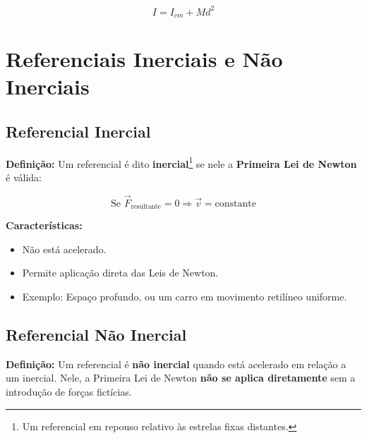 \documentclass[a4paper,12pt]{article}
\begin{document}
\begin{multicols}{2}
\[
I = I_{cm} + M d^2
\]

\section{Referenciais Inerciais e Não Inerciais}

\subsection*{Referencial Inercial}

\textbf{Definição:} Um referencial é dito \textbf{inercial}\footnote{Um referencial em repouso relativo às estrelas fixas distantes.} se nele a \textbf{Primeira Lei de Newton} é válida:

\[
\text{Se } \vec{F}_{\text{resultante}} = 0 \Rightarrow \vec{v} = \text{constante}
\]

\textbf{Características:}
\begin{itemize}
  \item Não está acelerado.
  \item Permite aplicação direta das Leis de Newton.
  \item Exemplo: Espaço profundo, ou um carro em movimento retilíneo uniforme.
\end{itemize}

\subsection{Referencial Não Inercial}

\textbf{Definição:} Um referencial é \textbf{não inercial} quando está acelerado em relação a um inercial. Nele, a Primeira Lei de Newton \textbf{não se aplica diretamente} sem a introdução de forças fictícias.


\end{multicols}
\end{document}
